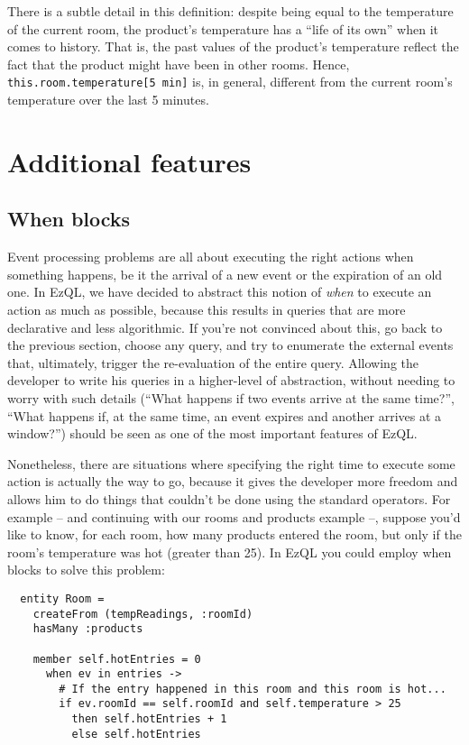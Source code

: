 \documentclass[a4,11pt]{report}
\begin{document}
There is a subtle detail in this definition: despite being equal to
the temperature of the current room, the product's temperature has a
``life of its own'' when it comes to history. That is, the past values
of the product's temperature reflect the fact that the product might
have been in other rooms. Hence, \verb=this.room.temperature[5 min]=
is, in general, different from the current room's temperature over the
last 5 minutes.


\section{Additional features}

\subsection{When blocks}

Event processing problems are all about executing the right actions
when something happens, be it the arrival of a new event or the
expiration of an old one. In EzQL, we have decided to abstract this
notion of \emph{when} to execute an action as much as possible,
because this results in queries that are more declarative and less
algorithmic. If you're not convinced about this, go back to the
previous section, choose any query, and try to enumerate the external
events that, ultimately, trigger the re-evaluation of the entire
query. Allowing the developer to write his queries in a higher-level
of abstraction, without needing to worry with such details (``What
happens if two events arrive at the same time?'', ``What happens if,
at the same time, an event expires and another arrives at a window?'')
should be seen as one of the most important features of EzQL.

Nonetheless, there are situations where specifying the right time to
execute some action is actually the way to go, because it gives the
developer more freedom and allows him to do things that couldn't be
done using the standard operators. For example -- and continuing with
our rooms and products example --, suppose you'd like to know, for
each room, how many products entered the room, but only if the room's
temperature was hot (greater than 25). In EzQL you could employ when
blocks to solve this problem:

\begin{lstlisting}
  entity Room =
    createFrom (tempReadings, :roomId)
    hasMany :products

    member self.hotEntries = 0
      when ev in entries ->
        # If the entry happened in this room and this room is hot...
        if ev.roomId == self.roomId and self.temperature > 25
          then self.hotEntries + 1
          else self.hotEntries


\end{lstlisting}
\end{document}
